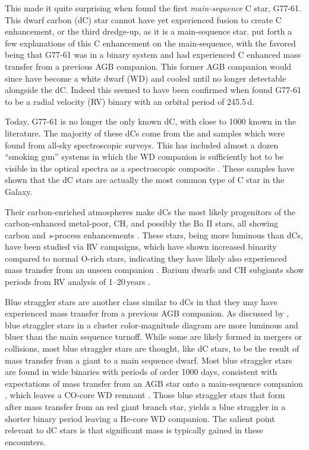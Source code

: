 \documentclass[twocolumn]{aastex631}
\begin{document}
This made it quite surprising when \citet{Dahn1977} found the first \textit{main-sequence} C star, G77-61. This dwarf carbon (dC) star cannot have yet experienced fusion to create C enhancement, or the third dredge-up, as it is a main-sequence star. \citet{Dahn1977} put forth a few explanations of this C enhancement on the main-sequence, with the favored being that G77-61 was in a binary system and had experienced C enhanced mass transfer from a previous AGB companion. This former AGB companion would since have become a white dwarf (WD) and cooled until no longer detectable alongside the dC. Indeed this seemed to have been confirmed when \cite{Dearborn1986} found G77-61 to be a radial velocity (RV) binary with an orbital period of 245.5\,d.

Today, G77-61 is no longer the only known dC, with close to 1000 known in the literature. The majority of these dCs come from the \citet{Green2013} and \citet{Si2014} samples which were found from all-sky spectroscopic surveys. This has included almost a dozen ``smoking gun'' systems in which the WD companion is sufficiently hot to be visible in the optical spectra as a spectroscopic composite \citep{Heber1993, Liebert1994, Green2013, Si2014}. These samples have shown that the dC stars are actually the most common type of C star in the Galaxy. 

Their carbon-enriched atmospheres make dCs the most likely progenitors of the carbon-enhanced metal-poor, CH, and possibly the Ba II stars, all showing carbon and \textit{s}-process enhancements \citep{Jorissen2016, DeMarco2017}. These stars, being more luminous than dCs, have been studied via RV campaigns, which have shown increased binarity compared to normal O-rich stars, indicating they have likely also experienced mass transfer from an unseen companion \citep{Sperauskas2016}. Barium dwarfs and CH subgiants show periods from RV analysis of 1--20\,years \citep{Escorza2019}.

Blue straggler stars are another class similar to dCs in that they may have experienced mass transfer from a previous AGB companion. As discussed by \citet{Gosnell2019}, blue straggler stars in a cluster color-magnitude diagram are more luminous and bluer than the main sequence turnoff. While some are likely formed in mergers or collisions, most blue straggler stars are thought, like dC stars, to be the result of mass transfer from a giant to a main sequence dwarf.  Most blue straggler stars are found in wide binaries with periods of order 1000 days, consistent with expectations of mass transfer from an AGB star onto a main-sequence companion \citep{Chen2008, Gosnell2014},  which leaves a CO-core WD remnant \citep{Paczynski1971}. Those blue straggler stars that form after mass transfer from an red giant branch star, yields a blue straggler in a shorter binary period \citep[of order 100 days;][]{Chen2008} leaving a He-core WD companion.  The salient point relevant to dC stars is that significant mass is typically gained in these encounters.
\end{document}
